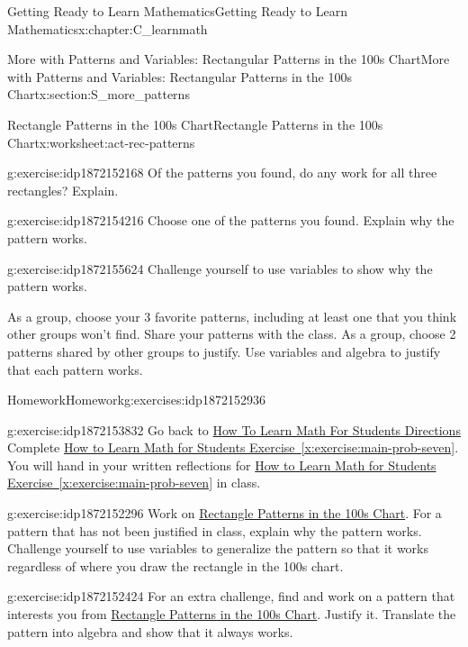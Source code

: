 \documentclass[oneside,10pt,]{book}
\newcommand{\xreffont}{\relax}
\numberwithin{equation}{chapter}
\begin{document}
\begin{chapterptx}{Getting Ready to Learn Mathematics}{}{Getting Ready to Learn Mathematics}{}{}{x:chapter:C_learnmath}
\begin{sectionptx}{More with Patterns and Variables: Rectangular Patterns in the 100s Chart}{}{More with Patterns and Variables: Rectangular Patterns in the 100s Chart}{}{}{x:section:S_more_patterns}
\begin{worksheet-subsection}{Rectangle Patterns in the 100s Chart}{}{Rectangle Patterns in the 100s Chart}{}{}{x:worksheet:act-rec-patterns}
\begin{divisionexercise}{4}{}{}{g:exercise:idp1872152168}
Of the patterns you found, do any work for all three rectangles? Explain.%
\end{divisionexercise}%
\begin{divisionexercise}{5}{}{}{g:exercise:idp1872154216}%
Choose one of the patterns you found. Explain why the pattern works.%
\end{divisionexercise}%
\begin{divisionexercise}{6}{}{}{g:exercise:idp1872155624}%
Challenge yourself to use variables to show why the pattern works.%
\end{divisionexercise}%
\begin{conclusion}{}%
As a group, choose your 3 favorite patterns, including at least one that you think other groups won't find. Share your patterns with the class. As a group, choose 2 patterns shared by other groups to justify. Use variables and algebra to justify that each pattern works.%
\end{conclusion}%
\end{worksheet-subsection}
\restoregeometry
%
%
\typeout{************************************************}
\typeout{************************************************}
%
\begin{exercises-subsection}{Homework}{}{Homework}{}{}{g:exercises:idp1872152936}
\begin{divisionexercise}{1}{}{}{g:exercise:idp1872153832}%
Go back to \hyperlink{x:paragraphs:htlmfs-directions}{How To Learn Math For Students Directions} Complete \hyperref[x:exercise:main-prob-seven]{How to Learn Math for Students Exercise~{\xreffont\ref{x:exercise:main-prob-seven}}}. You will hand in your written reflections for \hyperref[x:exercise:main-prob-seven]{How to Learn Math for Students Exercise~{\xreffont\ref{x:exercise:main-prob-seven}}} in class.%
\end{divisionexercise}%
\begin{divisionexercise}{2}{}{}{g:exercise:idp1872152296}%
Work on \hyperref[x:worksheet:act-rec-patterns]{Rectangle Patterns in the 100s Chart}. For a pattern that has not been justified in class, explain why the pattern works. Challenge yourself to use variables to generalize the pattern so that it works regardless of where you draw the rectangle in the 100s chart.%
\end{divisionexercise}%
\begin{divisionexercise}{3}{}{}{g:exercise:idp1872152424}%
For an extra challenge, find and work on a pattern that interests you from \hyperref[x:worksheet:act-rec-patterns]{Rectangle Patterns in the 100s Chart}. Justify it. Translate the pattern into algebra and show that it always works.%

\end{divisionexercise}
\end{exercises-subsection}
\end{sectionptx}
\end{chapterptx}
\end{document}
